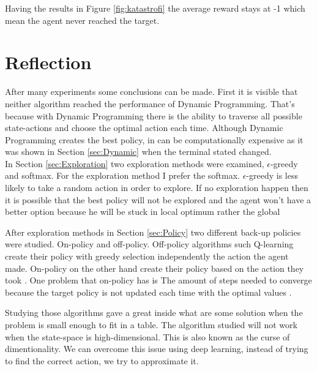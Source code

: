 \documentclass{article}
\begin{document}
Having the results in Figure \ref{fig:katastrofi} the average reward stays at -1 which mean the agent never reached the target.  










\section{Reflection}
After many experiments some conclusions can be made. First it is visible that neither algorithm reached the performance of Dynamic Programming.
That's because with Dynamic Programming there is the ability to traverse all possible state-actions and choose the optimal 
action each time.  Although Dynamic Programming creates the best policy, in can be computationally expensive as it was shown  in Section \ref{sec:Dynamic} when the terminal stated
changed. \\

In Section \ref{sec:Exploration} two exploration methods were examined, $\epsilon$-greedy and softmax. For the exploration method I prefer the softmax. $\epsilon$-greedy is less likely to take a random action in order to explore.
If no exploration happen then it is possible that the best policy will not be explored and the agent won't have a better option because he will be stuck in local optimum rather the global

After exploration methods in Section \ref{sec:Policy} two different back-up policies were studied. On-policy and off-policy.
Off-policy algorithms such Q-learning create their policy with greedy selection independently the action the agent made. 
On-policy on the other hand create their policy based on the action they took \cite{sagar_2020}. One problem that on-policy has is The
amount of steps needed to converge because the target policy is not updated each time with the optimal values \cite{Plaat_2022}.

Studying those algorithms gave a great inside what are some solution when the problem is small enough
to fit in a table. The algorithm studied will not work when the state-space is high-dimensional. 
This is also known as the curse of dimentionality.
We can overcome this issue   using deep learning, instead of trying to find the correct action, we try to approximate it.



\end{document}
